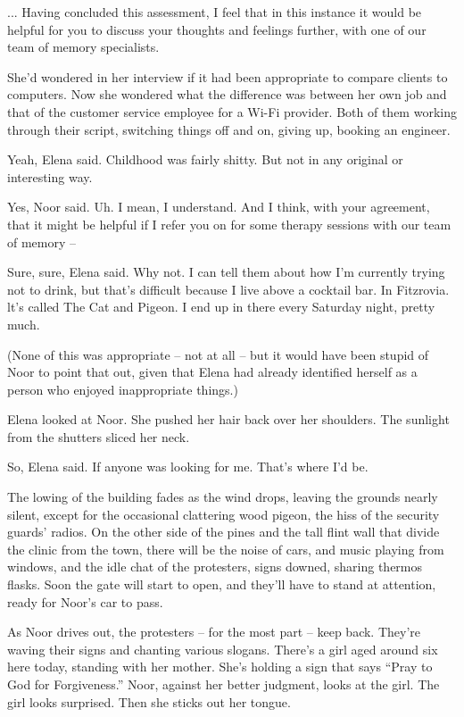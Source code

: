 \documentclass[12pt,a5paper]{book}
\newcommand{\qm}[1]{“#1”}
\newcommand{\storybreak}{%
  \par\vspace{0.6\baselineskip}
  \begin{center}\color{coveraccent}\small *\enspace *\enspace *\end{center}
  \vspace{0.3\baselineskip}\noindent\ignorespaces
}
\begin{document}
... Having concluded this assessment, I feel that in this instance it would be helpful for you to discuss your thoughts and feelings further, with one of our team of memory specialists.

She'd wondered in her interview if it had been appropriate to compare clients to computers. Now she wondered what the difference was between her own job and that of the customer service employee for a Wi-Fi provider. Both of them working through their script, switching things off and on, giving up, booking an engineer.

Yeah, Elena said. Childhood was fairly shitty. But not in any original or interesting way.

Yes, Noor said. Uh. I mean, I understand. And I think, with your agreement, that it might be helpful if I refer you on for some therapy sessions with our team of memory –

Sure, sure, Elena said. Why not. I can tell them about how I'm currently trying not to drink, but that's difficult because I live above a cocktail bar. In Fitzrovia. lt's called The Cat and Pigeon. I end up in there every Saturday night, pretty much.

(None of this was appropriate – not at all – but it would have been stupid of Noor to point that out, given that Elena had already identified herself as a person who enjoyed inappropriate things.)

Elena looked at Noor. She pushed her hair back over her shoulders. The sunlight from the shutters sliced her neck.

So, Elena said. If anyone was looking for me. That's where I'd be.

\storybreak

The lowing of the building fades as the wind drops, leaving the grounds nearly silent, except for the occasional clattering wood pigeon, the hiss of the security guards' radios. On the other side of the pines and the tall flint wall that divide the clinic from the town, there will be the noise of cars, and music playing from windows, and the idle chat of the protesters, signs downed, sharing thermos flasks. Soon the gate will start to open, and they'll have to stand at attention, ready for Noor's car to pass.

As Noor drives out, the protesters – for the most part – keep back. They're waving their signs and chanting various slogans. There's a girl aged around six here today, standing with her mother. She's holding a sign that says \qm{Pray to God for Forgiveness.} Noor, against her better judgment, looks at the girl. The girl looks surprised. Then she sticks out her tongue.
\end{document}
